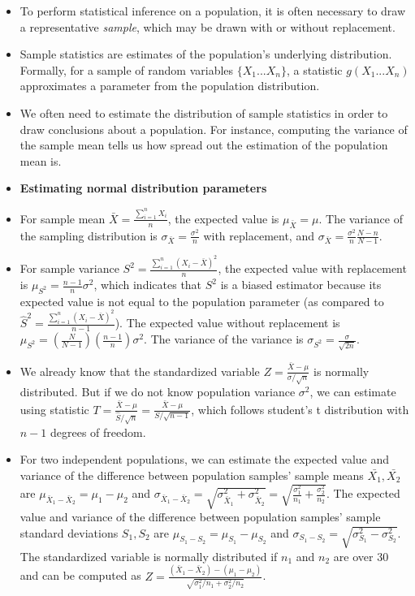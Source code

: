 \documentclass[11pt,letterpaper]{scrartcl}
\begin{document}
\begin{itemize}
\item To perform statistical inference on a population, it is often necessary to draw a representative \emph{sample}, which may be drawn with or without replacement.
\item Sample statistics are estimates of the population's underlying distribution. Formally, for a sample of random variables $\{X_{1} ... X_{n}\}$, a statistic $g(X_{1} ... X_{n})$ approximates a parameter from the population distribution. 
\item We often need to estimate the distribution of sample statistics in order to draw conclusions about a population. For instance, computing the variance of the sample mean tells us how spread out the estimation of the population mean is.
\item \textbf{Estimating normal distribution parameters}
\item For sample mean $\bar{X}=\frac{\sum_{i=1}^{n}X_{i}}{n}$, the expected value is $\mu_{\bar{X}}=\mu$. The variance of the sampling distribution is $\sigma_{\bar{X}} = \frac{\sigma^{2}}{n}$ with replacement, and $\sigma_{\bar{X}} = \frac{\sigma^{2}}{n}\frac{N-n}{N-1}$. 
\item For sample variance $S^{2} = \frac{\sum_{i=1}^{n}(X_{i}-\bar{X})^{2}}{n}$, the expected value with replacement is $\mu_{S^{2}} = \frac{n-1}{n}\sigma^{2}$, which indicates that $S^{2}$ is a biased estimator because its expected value is not equal to the population parameter (as compared to $\hat{S}^{2} = \frac{\sum_{i=1}^{n}(X_{i}-\bar{X})^{2}}{n-1}$). The expected value without replacement is $\mu_{S^{2}} = (\frac{N}{N-1})(\frac{n-1}{n})\sigma^{2}$. The variance of the variance is $\sigma_{S^{2}} = \frac{\sigma}{\sqrt{2n}}$.
\item We already know that the standardized variable $Z=\frac{\bar{X}-\mu}{\sigma / \sqrt{n}}$ is normally distributed. But if we do not know population variance $\sigma^{2}$, we can estimate using statistic $T = \frac{\bar{X} - \mu}{\hat{S} / \sqrt{n}} = \frac{\bar{X} - \mu}{S / \sqrt{n-1}}$, which follows student's t distribution with $n-1$ degrees of freedom.
\item For two independent populations, we can estimate the expected value and variance of the difference between population samples' sample means $\bar{X_{1}}, \bar{X_{2}}$ are $\mu_{\bar{X}_{1} - \bar{X}_{2}} = \mu_{1} - \mu_{2}$ and $\sigma_{\bar{X}_{1} - \bar{X}_{2}} = \sqrt{\sigma^{2}_{\bar{X}_{1}} + \sigma^{2}_{\bar{X}_{2}}} = \sqrt{\frac{\sigma_{1}^{2}}{n_{1}} + \frac{\sigma_{2}^{2}}{n_{2}}}$. The expected value and variance of the difference between population samples' sample standard deviations $S_{1}, S_{2}$ are $\mu_{S_{1} - S_{2}} = \mu_{S_{1}} - \mu_{S_{2}}$ and $\sigma_{S_{1} - S_{2}} = \sqrt{\sigma^{2}_{S_{1}} - \sigma^{2}_{S_{2}}}$. The standardized variable is normally distributed if $n_{1}$ and $n_{2}$ are over 30 and can be computed as $Z=\frac{(\bar{X}_{1} - \bar{X}_{2}) - (\mu_{1} - \mu_{2})}{\sqrt{\sigma_{1}^{2} / n_{1} + \sigma_{2}^{2} / n_{2}}}$.

\end{itemize}
\end{document}
